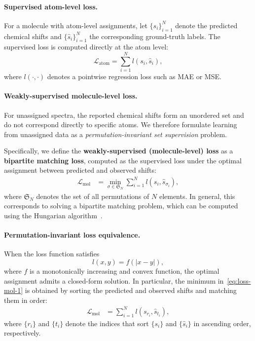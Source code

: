 \paragraph{Supervised atom-level loss.}
For a molecule with atom-level assignments, let $\{s_i\}_{i=1}^{N}$ denote the predicted chemical shifts and $\{\hat{s}_i\}_{i=1}^{N}$ the corresponding ground-truth labels.
The supervised loss is computed directly at the atom level:
\begin{equation}
\mathcal{L}_{\text{atom}} = \sum_{i=1}^{N} l(s_i, \hat{s}_i),
\label{eq:loss-atom}
\end{equation}
where $l(\cdot,\cdot)$ denotes a pointwise regression loss such as MAE or MSE.

\paragraph{Weakly-supervised molecule-level loss.}
For unassigned spectra, the reported chemical shifts form an unordered set and do not correspond directly to specific atoms.
We therefore formulate learning from unassigned data as a \emph{permutation-invariant set supervision} problem.

Specifically, we define the \textbf{weakly-supervised (molecule-level) loss} as a \textbf{bipartite matching loss}, computed as the supervised loss under the optimal assignment between predicted and observed shifts:
\begin{align}
\mathcal{L}_{\text{mol}} 
    &= \min_{\sigma \in \mathfrak{S}_N} \sum_{i=1}^{N} l(s_i, \hat{s}_{\sigma_i}),
    \label{eq:loss-mol-1}
\end{align}
where $\mathfrak{S}_N$ denotes the set of all permutations of $N$ elements.
In general, this corresponds to solving a bipartite matching problem, which can be computed using the Hungarian algorithm~\cite{kuhn1955hungarian,Munkres1957hungarian}.

\paragraph{Permutation-invariant loss equivalence.}
When the loss function satisfies
\begin{equation}
l(x,y) = f(|x-y|),
\end{equation}
where $f$ is a monotonically increasing and convex function, the optimal assignment admits a closed-form solution.
In particular, the minimum in~\eqref{eq:loss-mol-1} is obtained by sorting the predicted and observed shifts and matching them in order:
\begin{align}
\mathcal{L}_{\text{mol}}
    &= \sum_{i=1}^{N} l(s_{r_i}, \hat{s}_{t_i}),
    \label{eq:loss-mol-2}
\end{align}
where $\{r_i\}$ and $\{t_i\}$ denote the indices that sort $\{s_i\}$ and $\{\hat{s}_i\}$ in ascending order, respectively.

